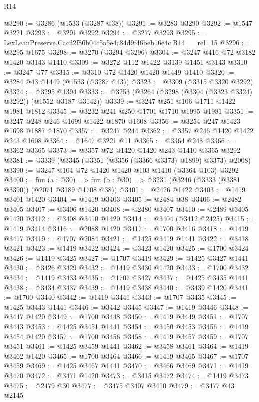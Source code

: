 \begin{lexlean}{R14}
\begin{coremodule}
@3290 := @3286 (@1533 (@3287 @38))
@3291 := @3283 @3290
@3292 := @1547 @3221
@3293 := @3291 @3292
@3294 := @3277 @3293
@3295 := LexLeanPreserve.Cac32f86b04c5a5e4c84d9f46beb16e4c.R14.__rel_15
@3296 := @3295 @1675
@3298 := @3270 (@3294 @3296)
@3304 := @3247 @416 @72 @3182 @1420 @3143 @1410
@3309 := @3272 @112 @1422 @3139 @1451 @3143
@3310 := @3247 @77
@3315 := @3310 @72 @1420 @1420 @1449 @1410
@3320 := @3284 @43 @1449 (@1533 (@3287 @43))
@3323 := @3309 (@3315 @3320 @3292)
@3324 := @3295 @1394
@3333 := @3253 (@3264 (@3298 (@3304 (@3323 @3324) @3292)) (@1552 @3187 @3142))
@3339 := @3247 @251 @106 @1711 @1422 @1981 @1812
@3345 := @3232 @241 @250 @1701 @1710 @1995 @1981
@3351 := @3247 @248 @246 @1699 @1422 @1870 @1608
@3356 := @3254 @247 @1423 @1698 @1887 @1870
@3357 := @3247 @244
@3362 := @3357 @246 @1420 @1422 @243 @1608
@3364 := @1647 @3221 @11
@3365 := @3364 @243
@3366 := @3362 @3365
@3373 := @3357 @72 @1420 @1420 @243 @1410 @3365 @3292
@3381 := @3339 (@3345 (@3351 (@3356 (@3366 @3373) @1899) @3373) @2008)
@3390 := @3247 @104 @72 @1420 @1420 @103 @1410 (@3364 @103) @3292
@3400 := fun (a : @30) =>
  fun (b : @30) => @3231 (@3246 (@3333 (@3381 @3390)) (@2071 @3189 @1708 @38))
@3401 := @2426 @1422
@3403 := @1419 @3401 @1420
@3404 := @1419 @3403
@3405 := @2484 @38
@3406 := @2482 @3405
@3407 := @3406 @1420
@3408 := @2480 @3407
@3410 := @2489 @3405 @1420
@3412 := @3408 @3410 @1420
@3414 := @3404 (@3412 @2425)
@3415 := @1419 @3414
@3416 := @2088 @1420
@3417 := @1700 @3416
@3418 := @1419 @3417
@3419 := @1707 @2084
@3421 := @1425 @3419 @1441
@3422 := @3418 @3421
@3423 := @1419 @3422
@3424 := @3423 @1420
@3425 := @1700 @3424
@3426 := @1419 @3425
@3427 := @1707 @3419
@3429 := @1425 @3427 @1441
@3430 := @3426 @3429
@3432 := @1419 @3430 @1420
@3433 := @1700 @3432
@3434 := @1419 @3433
@3435 := @1707 @3427
@3437 := @1425 @3435 @1441
@3438 := @3434 @3437
@3439 := @1419 @3438
@3440 := @3439 @1420
@3441 := @1700 @3440
@3442 := @1419 @3441
@3443 := @1707 @3435
@3445 := @1425 @3443 @1441
@3446 := @3442 @3445
@3447 := @1419 @3446
@3448 := @3447 @1420
@3449 := @1700 @3448
@3450 := @1419 @3449
@3451 := @1707 @3443
@3453 := @1425 @3451 @1441
@3454 := @3450 @3453
@3456 := @1419 @3454 @1420
@3457 := @1700 @3456
@3458 := @1419 @3457
@3459 := @1707 @3451
@3461 := @1425 @3459 @1441
@3462 := @3458 @3461
@3464 := @1419 @3462 @1420
@3465 := @1700 @3464
@3466 := @1419 @3465
@3467 := @1707 @3459
@3469 := @1425 @3467 @1441
@3470 := @3466 @3469
@3471 := @1419 @3470
@3472 := @3471 @1420
@3473 := @3415 @3472
@3474 := @1419 @3473
@3475 := @2479 @30
@3477 := @3475 @3407 @3410
@3479 := @3477 @43 @2145

\end{coremodule}
\end{lexlean}
